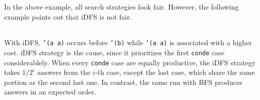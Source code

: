 \documentclass[format=acmlarge, review=true, authordraft=true]{acmart}
\begin{document}
In the above example, all search strategies look fair. However, the following 
example points out that iDFS is not fair.

\begin{center}
  \begin{tabular}{c}
   
   \end{tabular}
\end{center}

With iDFS, \texttt{'(a a)} occurs before \texttt{'(b)} while \texttt{'(a a)} is 
associated with a higher cost. iDFS strategy is the cause, since it prioritizes 
the first \texttt{conde} case considerablely. When every \texttt{conde} case 
are equally productive, the iDFS strategy takes $1/2^{i}$ answers from the 
$i$-th case, except the last case, which share the same portion as the second 
last one. In contrast, the same run with BFS produces answers in an expected 
order.

\begin{center}
  \begin{tabular}{c}
   
   \end{tabular}
\end{center}


% 
% 
% 
% 
% 
%   
 
\end{document}
